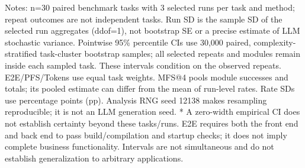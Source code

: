 \par\smallskip
\begin{minipage}{\linewidth}
\footnotesize Notes: n=30 paired benchmark tasks with 3 selected runs per task and method; repeat outcomes are not independent tasks. Run SD is the sample SD of the selected run aggregates (ddof=1), not bootstrap SE or a precise estimate of LLM stochastic variance. Pointwise 95\% percentile CIs use 30,000 paired, complexity-stratified task-cluster bootstrap samples; all selected repeats and modules remain inside each sampled task. These intervals condition on the observed repeats. E2E/PFS/Tokens use equal task weights. MFS@4 pools module successes and totals; its pooled estimate can differ from the mean of run-level rates. Rate SDs use percentage points (pp). Analysis RNG seed 12138 makes resampling reproducible; it is not an LLM generation seed. * A zero-width empirical CI does not establish certainty beyond these tasks/runs. E2E requires both the front end and back end to pass build/compilation and startup checks; it does not imply complete business functionality. Intervals are not simultaneous and do not establish generalization to arbitrary applications.
\end{minipage}
